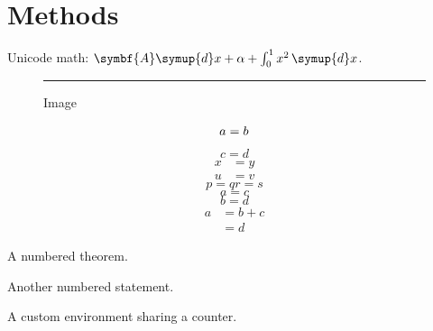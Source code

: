 
\section{Methods}\label{topic}
\ifdefined\WiseUnicode
  Unicode math: $\symbf{A}\symup{d}x+\alpha+\int_0^1 x^2\,\symup{d}x$.
\fi
\begin{figure}[htbp]\centering\rule{20mm}{3mm}\caption{Image}\label{picture}\end{figure}
\begin{table}[htbp]\caption{Table}\label{table}\end{table}
\begin{equation}a=b\label{equation}\ifdefined\WiseZref\zlabel{z-equation}\fi\end{equation}
\begin{equation}c=d\label{only-wise}\end{equation}
\begin{align}x&=y\label{line-a}\\u&=v\label{line-b}\end{align}
\begin{subequations}\label{family}
  \begin{equation}p=q\label{child-a}\end{equation}
  \begin{equation}r=s\label{child-b}\end{equation}
\end{subequations}
\begin{equation}a=c\tag{S}\label{tagged}\end{equation}
\begin{equation}b=d\tag*{S}\label{bare}\end{equation}
\ifdefined\WiseMathtools
  \begin{equation}\begin{split}a&=b+c\\&=d\end{split}\label{split}\end{equation}
\fi
\begin{theorem}\label{statement}A numbered theorem.\end{theorem}
\begin{lemma}\label{lemma}Another numbered statement.\end{lemma}
\ifdefined\WiseNTStress
  \begin{claim}\label{nt-claim}A custom environment sharing a counter.\end{claim}
